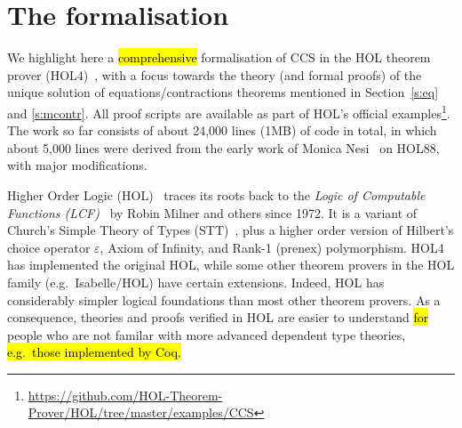 
\newcommand\fun{{\to}}
\newcommand\prd{{\times}}
\newcommand{\ty}[1]{\textsl{#1}}
\newcommand\conj{\ \wedge\ }
\newcommand\disj{\ \vee\ }
\newcommand\imp{ \Rightarrow }
\newcommand\eqv{\ \equiv\ }
\newcommand\vbar{\mid}
\newcommand\turn{\ \vdash\ } %
\newcommand\hilbert{\varepsilon}
\newcommand{\uquant}[1]{\forall #1.\ }
\newcommand{\equant}[1]{\exists #1.\ }
\newcommand{\hquant}[1]{\hilbert #1.\ }
\newcommand{\iquant}[1]{\exists ! #1.\ }
\newcommand{\lquant}[1]{\lambda #1.\ }
\newcommand{\ml}[1]{\mbox{{\def\_{\char'137}\texttt{#1}}}}
\newcommand{\con}[1]{\mathrm{#1}}

\newcommand\bool{\ty{bool}}
\newcommand\num{\ty{num}}
\newcommand\ind{\ty{ind}}
\newcommand\lst{\ty{list}}

\providecommand{\T}{\con{T}}
\renewcommand{\T}{\con{T}}
\newcommand\F{\con{F}}
\newcommand\OneOne{\con{One\_One}}
\newcommand\OntoSubset{\con{Onto\_Subset}}
\newcommand\Onto{\con{Onto}}
\newcommand\TyDef{\con{Type\_Definition}}

\section{The formalisation}
\label{s:for}

We highlight here a \hl{comprehensive} formalisation of CCS in the HOL theorem prover
(HOL4)~\cite{Melham:1993vl,slind2008brief}, with a focus towards the
theory (and formal proofs) of the unique solution of
equations/contractions theorems mentioned in Section~\ref{s:eq} and
\ref{s:mcontr}.
All proof scripts are available as part of HOL's official
examples\footnote{\url{https://github.com/HOL-Theorem-Prover/HOL/tree/master/examples/CCS}}.
The work so far consists of about 24,000 lines (1MB) of code in total,
in which about 5,000 lines were derived from the early work of Monica
Nesi~\cite{Nesi:1992ve} on HOL88, with major modifications.

Higher Order Logic (HOL)~\cite{hollogic} traces
its roots back to the
\emph{Logic of Computable Functions
  (LCF)}~\cite{gordon1979edinburgh,milner1972logic}
by Robin Milner and others
since 1972. It is a variant of
Church’s Simple Theory of Types (STT)~\cite{church1940formulation},
plus a higher order version of Hilbert's choice operator $\varepsilon$,
Axiom of Infinity, and Rank-1 (prenex) polymorphism.
HOL4 has implemented the original HOL, 
while some other theorem provers in the HOL family (e.g.~Isabelle/HOL) have
certain extensions.
Indeed, HOL has considerably simpler logical
foundations than most other theorem provers.
As a consequence, theories and proofs verified in HOL are easier to understand
 \hl{for} people who are not familar with more advanced
dependent type theories, \hl{e.g.~those implemented by Coq.}

